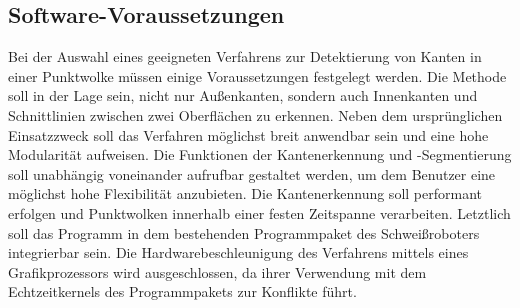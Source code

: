 \subsection{Software-Voraussetzungen}\label{soft_voraus}
Bei der Auswahl eines geeigneten Verfahrens zur Detektierung von Kanten in einer Punktwolke müssen einige Voraussetzungen festgelegt werden. Die Methode soll in der Lage sein, nicht nur Außenkanten, sondern auch Innenkanten und Schnittlinien zwischen zwei Oberflächen zu erkennen. Neben dem ursprünglichen Einsatzzweck soll das Verfahren möglichst breit anwendbar sein und eine hohe Modularität aufweisen. Die Funktionen der Kantenerkennung und -Segmentierung soll unabhängig voneinander aufrufbar gestaltet werden, um dem Benutzer eine möglichst hohe Flexibilität anzubieten. Die Kantenerkennung soll performant erfolgen und Punktwolken innerhalb einer festen Zeitspanne verarbeiten. Letztlich soll das Programm in dem bestehenden Programmpaket des Schweißroboters integrierbar sein. Die Hardwarebeschleunigung des Verfahrens mittels eines Grafikprozessors wird ausgeschlossen, da ihrer Verwendung mit dem Echtzeitkernels des Programmpakets zur Konflikte führt. 

